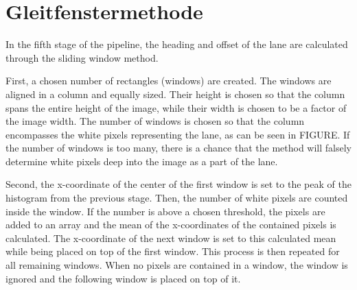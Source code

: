 \documentclass[arbeit=studie,oneside,BCOR=12mm]{ArbeitRST}
\begin{document}
\section{Gleitfenstermethode}


In the fifth stage of the pipeline, the heading and offset of the lane are
calculated through the sliding window method.

First, a chosen number of rectangles (windows) are created. The windows are
aligned in a column and equally sized. Their height is chosen so that the
column spans the entire height of the image, while their width is chosen to be
a factor of the image width. The number of windows is chosen so that the column
encompasses the white pixels representing the lane,
as can be seen in FIGURE. If the number of windows is too many, there is a
chance that the method will falsely determine white pixels deep into the image
as a part of the lane. 

Second, the x-coordinate of the center of the first window is set to the peak
of the histogram from the previous stage. Then, the number of white pixels are
counted inside the window. If the number is above a chosen threshold, the
pixels are added to an array and the mean of the x-coordinates of the contained
pixels is calculated. The x-coordinate of the next window is set to this
calculated mean while being placed on top of the first window. This process is
then repeated for all remaining windows. When no pixels are contained in a
window, the window is ignored and the following window is placed on top of it.
\iffalse
In the image coordinate system, the top left corner of the image is $(0, 0)$,
with the positive x-axis increasing to the right, while the positive y-axis
increases moving down the image. Therefore, the bottom edge of the image would
be any coordinate with a y component equal to the height of the image. Seen
from the engineer's perspective, the windows would be stacked from lowest to
highest, however in the image coordinate space it is inverted. 
\fi
\end{document}

